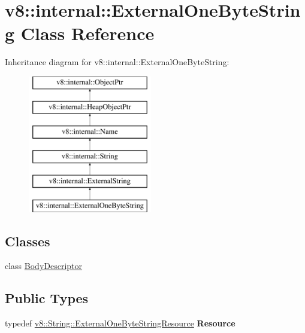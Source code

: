 \hypertarget{classv8_1_1internal_1_1ExternalOneByteString}{}\section{v8\+:\+:internal\+:\+:External\+One\+Byte\+String Class Reference}
\label{classv8_1_1internal_1_1ExternalOneByteString}
Inheritance diagram for v8\+:\+:internal\+:\+:External\+One\+Byte\+String\+:\begin{figure}[H]
\begin{center}
\leavevmode
\includegraphics[height=6.000000cm]{classv8_1_1internal_1_1ExternalOneByteString}
\end{center}
\end{figure}
\subsection*{Classes}
\begin{DoxyCompactItemize}
\item 
class \mbox{\hyperlink{classv8_1_1internal_1_1ExternalOneByteString_1_1BodyDescriptor}{Body\+Descriptor}}
\end{DoxyCompactItemize}
\subsection*{Public Types}
\begin{DoxyCompactItemize}
\item 
\mbox{\label{classv8_1_1internal_1_1ExternalOneByteString_a6a4abdba6f54562050b981e87c302005}} 
typedef \mbox{\hyperlink{classv8_1_1String_1_1ExternalOneByteStringResource}{v8\+::\+String\+::\+External\+One\+Byte\+String\+Resource}} {\bfseries Resource}
\end{DoxyCompactItemize}
